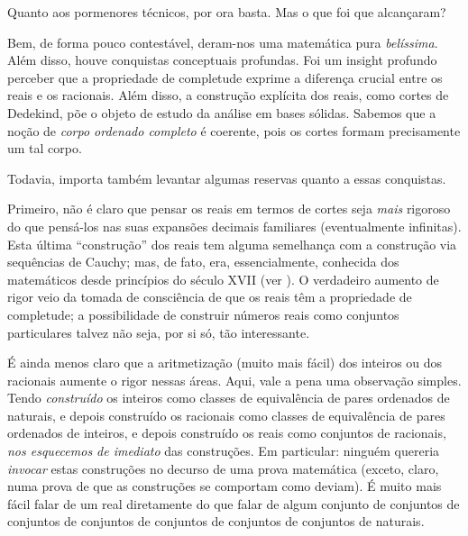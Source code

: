 \documentclass[../../../include/open-logic-section]{subfiles}
\begin{document}

Quanto aos pormenores técnicos, por ora basta. Mas o que foi que alcançaram?

Bem, de forma pouco contestável, deram-nos uma matemática pura \emph{belíssima}.
Além disso, houve conquistas conceptuais profundas. Foi um insight
profundo perceber que a propriedade de completude exprime a diferença crucial
entre os reais e os racionais. Além disso, a construção explícita dos reais,
como cortes de Dedekind, põe o objeto de estudo da análise em bases sólidas.
Sabemos que a noção de \emph{corpo ordenado completo} é coerente, pois os cortes
formam precisamente um tal corpo.

Todavia, importa também levantar algumas reservas quanto a essas conquistas.

Primeiro, não é claro que pensar os reais em termos de cortes seja
\emph{mais} rigoroso do que pensá-los nas suas expansões decimais familiares
(eventualmente infinitas). Esta última ``construção'' dos reais tem alguma
semelhança com a construção via sequências de Cauchy; mas, de fato, era,
essencialmente, conhecida dos matemáticos desde princípios do século XVII (ver
). O verdadeiro aumento de rigor veio da tomada de consciência
de que os reais têm a propriedade de completude; a possibilidade de construir
números reais como conjuntos particulares talvez não seja, por si só, tão
interessante.

É ainda menos claro que a aritmetização (muito mais fácil) dos inteiros ou dos
racionais aumente o rigor nessas áreas. Aqui, vale a pena uma observação simples.
Tendo \emph{construído} os inteiros como classes de equivalência de pares
ordenados de naturais, e depois construído os racionais como classes de
equivalência de pares ordenados de inteiros, e depois construído os reais como
conjuntos de racionais, \emph{nos esquecemos de imediato} das construções. Em
particular: ninguém quereria \emph{invocar} estas construções no decurso de uma
prova matemática (exceto, claro, numa prova de que as construções se comportam
como deviam). É muito mais fácil falar de um real diretamente do que falar de
algum conjunto de conjuntos de conjuntos de conjuntos de conjuntos de conjuntos
de conjuntos de naturais. 
%
%
%
	
\end{document}
